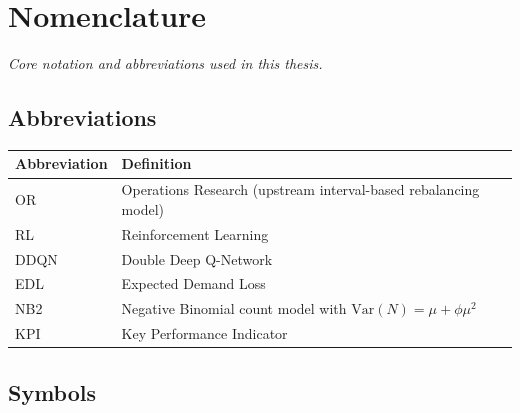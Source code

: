\chapter*{Nomenclature}

\emph{Core notation and abbreviations used in this thesis.}

\section*{Abbreviations}

\begin{longtable}{p{2.5cm}p{8cm}}
    \toprule
    Abbreviation & Definition \\
    \midrule\endhead
    OR & Operations Research (upstream interval-based rebalancing model) \\
    RL & Reinforcement Learning \\
    DDQN & Double Deep Q-Network \\
    EDL & Expected Demand Loss \\
    NB2 & Negative Binomial count model with \(\mathrm{Var}(N)=\mu+\phi\mu^2\) \\
    KPI & Key Performance Indicator \\
    \bottomrule
\end{longtable}

\section*{Symbols}

